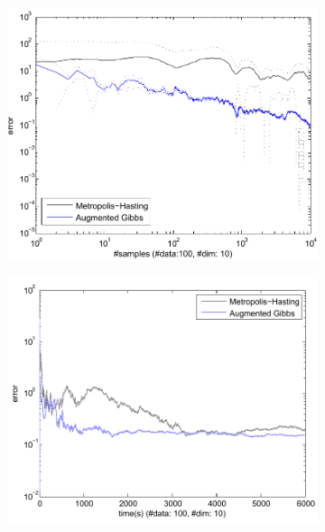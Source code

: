 \begin{figure}
\begin{subfigure}{.40\textwidth}
  \centering
  \includegraphics[width=1.00\textwidth]{pic/errorVSamplesBPPL-Big.pdf}%
  \caption{}
  \label{fig:error-samples-bppl}
\end{subfigure}%
\begin{subfigure}{.40\textwidth}
  \centering
  \includegraphics[width=1.05\textwidth]{pic/EVTBigBPPL.pdf}
  \caption{}
  \label{fig:error-samples-bppl}
\end{subfigure}%
\\
\begin{subfigure}{.40\textwidth}

\end{subfigure}
\end{figure}
